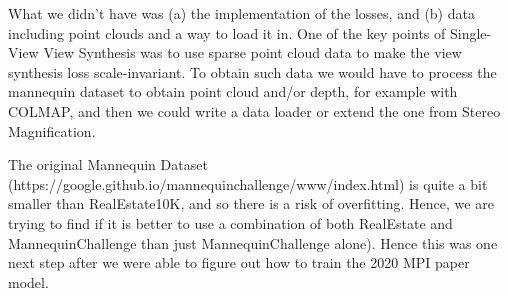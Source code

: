 What we didn't have was (a) the implementation of the losses, and (b) data including point clouds and a way to load it in.
One of the key points of Single-View View Synthesis was to use sparse point cloud data to make the view synthesis loss scale-invariant. To obtain such data we would have to process the mannequin dataset to obtain point cloud and/or depth, for example with COLMAP, and then we could write a data loader or extend the one from Stereo Magnification.

The original Mannequin Dataset (https://google.github.io/mannequinchallenge/www/index.html) is quite a bit smaller than RealEstate10K, and so there is a risk of overfitting. Hence, we are trying to find if it is better to use a combination of both RealEstate and MannequinChallenge than just MannequinChallenge alone). Hence this was one next step after we were able to figure out how to train the 2020 MPI paper model.









